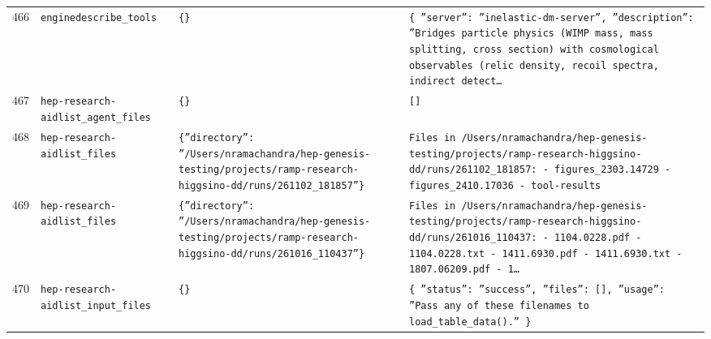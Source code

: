 \documentclass[11pt,a4paper]{article}
\begin{document}
\begin{longtable}{@{}p{}p{}p{}p{}@{}}
466 & \texttt{engine}\newline\texttt{describe\_\allowbreak{}tools} & \texttt{\{\}\allowbreak{}} & \texttt{\{   ''server'':\allowbreak{} ''inelastic-dm-server'',\allowbreak{}   ''description'':\allowbreak{} ''Bridges particle physics (WIMP mass,\allowbreak{} mass splitting,\allowbreak{} cross section)\allowbreak{} with cosmological observables (relic density,\allowbreak{} recoil spectra,\allowbreak{} indirect detect\ldots{}\allowbreak{}} \\
467 & \texttt{hep-research-aid}\newline\texttt{list\_\allowbreak{}agent\_\allowbreak{}files} & \texttt{\{\}\allowbreak{}} & \texttt{[]\allowbreak{}} \\
468 & \texttt{hep-research-aid}\newline\texttt{list\_\allowbreak{}files} & \texttt{\{''directory'':\allowbreak{} ''/\allowbreak{}Users/\allowbreak{}nramachandra/\allowbreak{}hep-genesis-testing/\allowbreak{}projects/\allowbreak{}ramp-research-higgsino-dd/\allowbreak{}runs/\allowbreak{}261102\_\allowbreak{}181857''\}\allowbreak{}} & \texttt{Files in /\allowbreak{}Users/\allowbreak{}nramachandra/\allowbreak{}hep-genesis-testing/\allowbreak{}projects/\allowbreak{}ramp-research-higgsino-dd/\allowbreak{}runs/\allowbreak{}261102\_\allowbreak{}181857:\allowbreak{}   - figures\_\allowbreak{}2303.14729   - figures\_\allowbreak{}2410.17036   - tool-results} \\
469 & \texttt{hep-research-aid}\newline\texttt{list\_\allowbreak{}files} & \texttt{\{''directory'':\allowbreak{} ''/\allowbreak{}Users/\allowbreak{}nramachandra/\allowbreak{}hep-genesis-testing/\allowbreak{}projects/\allowbreak{}ramp-research-higgsino-dd/\allowbreak{}runs/\allowbreak{}261016\_\allowbreak{}110437''\}\allowbreak{}} & \texttt{Files in /\allowbreak{}Users/\allowbreak{}nramachandra/\allowbreak{}hep-genesis-testing/\allowbreak{}projects/\allowbreak{}ramp-research-higgsino-dd/\allowbreak{}runs/\allowbreak{}261016\_\allowbreak{}110437:\allowbreak{}   - 1104.0228.pdf   - 1104.0228.txt   - 1411.6930.pdf   - 1411.6930.txt   - 1807.06209.pdf   - 1\ldots{}\allowbreak{}} \\
470 & \texttt{hep-research-aid}\newline\texttt{list\_\allowbreak{}input\_\allowbreak{}files} & \texttt{\{\}\allowbreak{}} & \texttt{\{   ''status'':\allowbreak{} ''success'',\allowbreak{}   ''files'':\allowbreak{} []\allowbreak{},\allowbreak{}   ''usage'':\allowbreak{} ''Pass any of these filenames to load\_\allowbreak{}table\_\allowbreak{}data()\allowbreak{}.'' \}\allowbreak{}} \\

\end{longtable}
\end{document}
